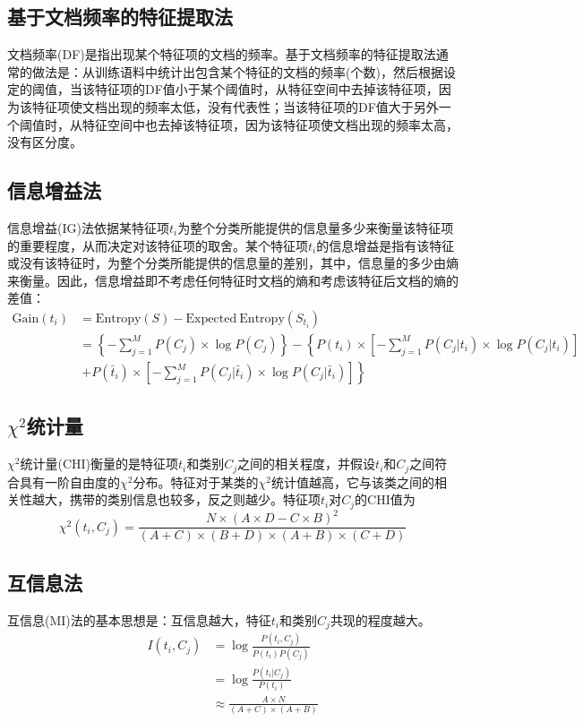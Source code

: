 \documentclass{clv3}
\begin{document}
\subsection{基于文档频率的特征提取法}
文档频率(DF)是指出现某个特征项的文档的频率。基于文档频率的特征提取法通常的做法是：从训练语料中统计出包含某个特征的文档的频率(个数)，然后根据设定的阈值，当该特征项的DF值小于某个阈值时，从特征空间中去掉该特征项，因为该特征项使文档出现的频率太低，没有代表性；当该特征项的DF值大于另外一个阈值时，从特征空间中也去掉该特征项，因为该特征项使文档出现的频率太高，没有区分度。
\subsection{信息增益法}
信息增益(IG)法依据某特征项$t_i$为整个分类所能提供的信息量多少来衡量该特征项的重要程度，从而决定对该特征项的取舍。某个特征项$t_i$的信息增益是指有该特征或没有该特征时，为整个分类所能提供的信息量的差别，其中，信息量的多少由熵来衡量。因此，信息增益即不考虑任何特征时文档的熵和考虑该特征后文档的熵的差值：
\begin{equation}
	\begin{aligned}
		\mathrm{Gain}(t_i)&=\mathrm{Entropy}(S)-\mathrm{Expected\ Entropy}(S_{t_i})\\
		&=\left\{-\sum_{j=1}^{M}P(C_j)\times \log P(C_j) \right\}-\left\{P(t_i)\times \left[-\sum_{j=1}^{M}P(C_j|t_i)\times \log P(C_j|t_i) \right] \right.\\
		&\ \left. +P(\bar{t}_i)\times \left[-\sum_{j=1}^{M}P(C_j|\bar{t}_i)\times \log P(C_j|\bar{t}_i)\right]\right\}
	\end{aligned}
\end{equation}
\subsection{$\chi^2$统计量}
$\chi^2$统计量(CHI)衡量的是特征项$t_i$和类别$C_j$之间的相关程度，并假设$t_i$和$C_j$之间符合具有一阶自由度的$\chi^2$分布。特征对于某类的$\chi^2$统计值越高，它与该类之间的相关性越大，携带的类别信息也较多，反之则越少。特征项$t_i$对$C_j$的CHI值为
\begin{equation}
	\chi^2(t_i,C_j)=\frac{N\times (A\times D-C\times B)^2}{(A+C)\times (B+D)\times (A+B)\times (C+D)}
\end{equation}
\subsection{互信息法}
互信息(MI)法的基本思想是：互信息越大，特征$t_i$和类别$C_j$共现的程度越大。
\begin{equation}
	\begin{aligned}
		I(t_i,C_j)&=\log \frac{P(t_i,C_j)}{P(t_i)P(C_j)}\\
		&=\log \frac{P(t_i|C_j)}{P(t_i)}\\
		&\approx \frac{A\times N}{(A+C)\times (A+B)}
	\end{aligned}
\end{equation}
\end{document}
